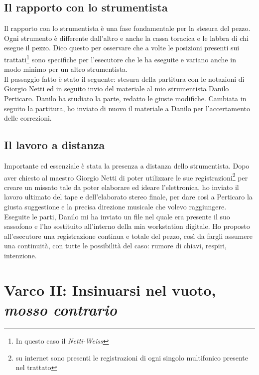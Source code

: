 \subsection{Il rapporto con lo strumentista}

Il rapporto con lo strumentista è una fase fondamentale per la stesura del pezzo. Ogni strumento è differente dall'altro e anche la cassa toracica e le labbra di chi esegue il pezzo. Dico questo per osservare che a volte le posizioni presenti sui trattati\footnote{In questo caso il \textit{Netti-Weiss}} sono specifiche per l'esecutore che le ha eseguite e variano anche in modo minimo per un altro strumentista. \\
Il passaggio fatto è stato il seguente: stesura della partitura con le notazioni di Giorgio Netti ed in seguito invio del materiale al mio strumentista Danilo Perticaro. Danilo ha studiato la parte, redatto le giuste modifiche. Cambiata in seguito la partitura, ho inviato di nuovo il materiale a Danilo per l'accertamento delle correzioni.

\subsection{Il lavoro a distanza}

Importante ed essenziale è stata la presenza a distanza dello strumentista. Dopo aver chiesto al maestro Giorgio Netti di poter utilizzare le sue registrazioni\footnote{su internet sono presenti le registrazioni di ogni singolo multifonico presente nel trattato} per creare un missato tale da poter elaborare ed ideare l'elettronica, ho inviato il lavoro ultimato del tape e dell'elaborato stereo finale, per dare così a Perticaro la giusta suggestione e la precisa direzione musicale che volevo raggiungere. \\
Eseguite le parti, Danilo mi ha inviato un file nel quale era presente il suo sassofono e l'ho sostituito all'interno della mia workstation digitale. Ho proposto all'esecutore una registrazione continua e totale del pezzo, così da fargli assumere una continuità, con tutte le possibilità del caso: rumore di chiavi, respiri, intenzione. 


\section{Varco II: Insinuarsi nel vuoto, \textit{mosso contrario}}


